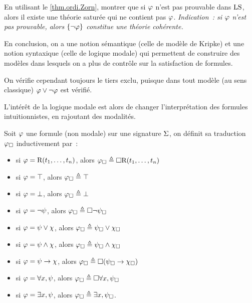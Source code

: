 \begin{exercise}
  En utilisant le \cref{thm.ordi.Zorn}, montrer que si $\varphi$ n'est pas
  prouvable dans $\operatorname{LS}$, alors il existe une théorie saturée qui ne contient
  pas $\varphi$. \textit{Indication~: si $\varphi$ n'est pas prouvable, alors
    $\{\lnot\varphi\}$ constitue une théorie cohérente.}
\end{exercise}

En conclusion, on a une notion sémantique (celle de modèle de Kripke) et une
notion syntaxique (celle de logique modale) qui permettent de construire des
modèles dans lesquels on a plus de contrôle sur la satisfaction de formules.

On vérifie cependant toujours le tiers exclu, puisque dans tout modèle (au sens
classique) $\varphi\lor\lnot\varphi$ est vérifié.

L'intérêt de la logique modale est alors de changer l'interprétation des
formules intuitionnistes, en rajoutant des modalités.

\begin{definition}
  Soit $\varphi$ une formule (non modale) sur une signature $\Sigma$, on
  définit sa traduction $\varphi_{\mathbin{\square}}$ inductivement par~:
  \begin{itemize}
  \item si $\varphi = \mathrm{R}(t_1,\ldots,t_n)$, alors
    $\varphi_{\mathbin{\square}} \triangleq \mathbin{\square} \mathrm{R}(t_1,\ldots,t_n)$
  \item si $\varphi = \top$, alors $\varphi_{\mathbin{\square}} \triangleq \top$
  \item si $\varphi = \bot$, alors $\varphi_{\mathbin{\square}} \triangleq \bot$
  \item si $\varphi = \lnot \psi$, alors
    $\varphi_{\mathbin{\square}} \triangleq \mathbin{\square}\lnot\psi_{\mathbin{\square}}$
  \item si $\varphi = \psi \lor \chi$, alors
    $\varphi_{\mathbin{\square}} \triangleq \psi_{\mathbin{\square}}\lor \chi_{\mathbin{\square}}$
  \item si $\varphi = \psi \land \chi$, alors
    $\varphi_{\mathbin{\square}} \triangleq \psi_{\mathbin{\square}}\land\chi_{\mathbin{\square}}$
  \item si $\varphi = \psi \to \chi$, alors
    $\varphi_{\mathbin{\square}} \triangleq \mathbin{\square}(\psi_{\mathbin{\square}} \to \chi_{\mathbin{\square}})$
  \item si $\varphi = \forall x, \psi$, alors
    $\varphi_{\mathbin{\square}} \triangleq \mathbin{\square} \forall x,\psi_{\mathbin{\square}}$
  \item si $\varphi = \exists x, \psi$, alors
    $\varphi_{\mathbin{\square}} \triangleq \exists x, \psi_{\mathbin{\square}}$.
  \end{itemize}
\end{definition}

